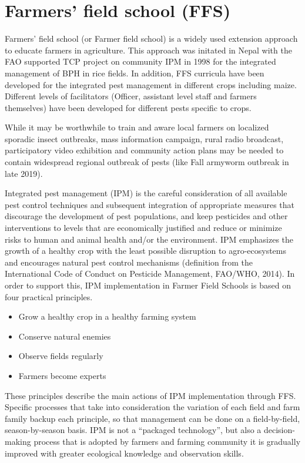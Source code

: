 \documentclass[
  openany]{book}
\providecommand{\tightlist}{%
  \setlength{\itemsep}{0pt}\setlength{\parskip}{0pt}}
\begin{document}
\hypertarget{farmers-field-school-ffs}{%
\section{Farmers' field school (FFS)}\label{farmers-field-school-ffs}}

Farmers' field school (or Farmer field school) is a widely used extension approach to educate farmers in agriculture. This approach was initated in Nepal with the FAO supported TCP project on community IPM in 1998 for the integrated management of BPH in rice fields. In addition, FFS curricula have been developed for the integrated pest management in different crops including maize. Different levels of facilitators (Officer, assistant level staff and farmers themselves) have been developed for different pests specific to crops.

While it may be worthwhile to train and aware local farmers on localized sporadic insect outbreaks, mass information campaign, rural radio broadcast, participatory video exhibition and community action plans may be needed to contain widespread regional outbreak of pests (like Fall armyworm outbreak in late 2019).

Integrated pest management (IPM) is the careful consideration of all available pest control techniques and subsequent integration of appropriate measures that discourage the development of pest populations, and keep pesticides and other interventions to levels that are economically justified and reduce or minimize risks to human and animal health and/or the environment. IPM emphasizes the growth of a healthy crop with the least possible disruption to agro-ecosystems and encourages natural pest control mechanisms (definition from the International Code of Conduct on Pesticide Management, FAO/WHO, 2014). In order to support this, IPM implementation in Farmer Field Schools is based on four practical principles.

\begin{itemize}
\tightlist
\item
  Grow a healthy crop in a healthy farming system
\item
  Conserve natural enemies
\item
  Observe fields regularly
\item
  Farmers become experts
\end{itemize}

These principles describe the main actions of IPM implementation through FFS. Specific processes that take into consideration the variation of each field and farm family backup each principle, so that management can be done on a field-by-field, season-by-season basis. IPM is not a ``packaged technology'', but also a decision-making process that is adopted by farmers and farming community it is gradually improved with greater ecological knowledge and observation skills.
\end{document}
